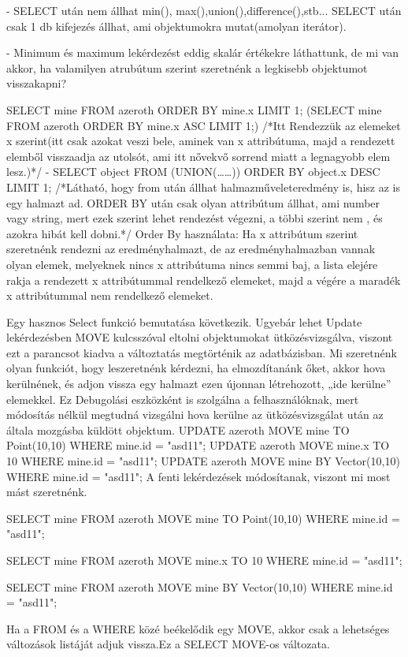 - SELECT után nem állhat min(), max(),union(),difference(),stb...
SELECT után csak 1 db kifejezés állhat, ami objektumokra mutat(amolyan iterátor).

- Minimum és maximum lekérdezést eddig skalár értékekre láthattunk, de mi van akkor, ha valamilyen atrubútum szerint szeretnénk a legkisebb objektumot visszakapni?

SELECT mine FROM azeroth ORDER BY mine.x LIMIT 1;
(SELECT mine FROM azeroth ORDER BY mine.x ASC LIMIT 1;)
/*Itt Rendezzük az elemeket x szerint(itt csak azokat veszi bele, aminek van x attribútuma, majd a rendezett elemből visszaadja az utolsót, ami itt nővekvő sorrend miatt a legnagyobb elem lesz.)*/
- SELECT object FROM (UNION(……)) ORDER BY object.x DESC LIMIT 1;
/*Látható, hogy from után állhat halmazműveleteredmény is, hisz az is egy halmazt ad. ORDER BY után csak olyan attribútum állhat, ami number vagy string, mert ezek szerint lehet rendezést végezni, a többi szerint nem , és azokra hibát kell dobni.*/
Order By használata: Ha x attribútum szerint szeretnénk rendezni az eredményhalmazt, de az eredményhalmazban vannak olyan elemek, melyeknek nincs x attribútuma nincs semmi baj, a lista elejére rakja a rendezett x attribútummal rendelkező elemeket, majd a végére a maradék x attribútummal nem rendelkező elemeket. 

Egy hasznos Select funkció bemutatása következik. Ugyebár lehet Update lekérdezésben MOVE kulcsszóval eltolni objektumokat ütközésvizsgálva, viszont ezt a parancsot kiadva a változtatás megtörténik az adatbázisban.
Mi szeretnénk olyan funkciót, hogy leszeretnénk kérdezni, ha elmozdítanánk őket, akkor hova kerülnének, és adjon vissza egy halmazt ezen újonnan létrehozott, „ide kerülne” elemekkel. Ez Debugolási eszközként is szolgálna a felhasználóknak, mert módosítás nélkül megtudná vizsgálni hova kerülne az ütközésvizsgálat után az általa mozgásba küldött objektum.
UPDATE azeroth MOVE  mine TO  Point(10,10) WHERE mine.id = "asd11"; 
UPDATE azeroth MOVE  mine.x TO 10 WHERE mine.id = "asd11"; 
UPDATE azeroth MOVE  mine BY  Vector(10,10) WHERE mine.id = "asd11"; 
A fenti lekérdezések módosítanak, viszont mi most mást szeretnénk.

SELECT mine FROM azeroth MOVE  mine TO  Point(10,10) WHERE mine.id = "asd11"; 

SELECT mine FROM azeroth MOVE  mine.x TO 10 WHERE mine.id = "asd11"; 

SELECT mine FROM azeroth MOVE  mine BY  Vector(10,10) WHERE mine.id = "asd11";

Ha a FROM és a WHERE közé beékelődik egy MOVE, akkor csak a lehetséges változások listáját adjuk vissza.Ez a SELECT MOVE-os változata.

